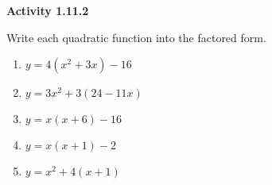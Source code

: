 \vspace{1ex}
\noindent\textbf{Activity 1.11.2}

\vspace{0.75ex}

Write each quadratic function into the factored form. 
\begin{multicols}{2}
\begin{enumerate}[label = \color{blue}\arabic*. ]
\item $ y = 4(x^2 + 3x) - 16  $
\item $ y = 3x^2 + 3(24 - 11x) $
\item $ y = x(x+6) - 16 $
\item $ y = x(x+1) - 2 $
\item $ y = x^2 + 4(x + 1) $
\end{enumerate}
\end{multicols} 

